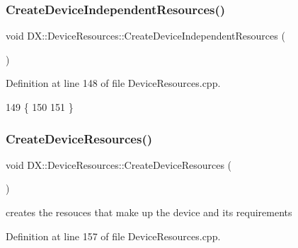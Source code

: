 \subsubsection{\texorpdfstring{Create\+Device\+Independent\+Resources()}{CreateDeviceIndependentResources()}}
{\footnotesize\ttfamily void D\+X\+::\+Device\+Resources\+::\+Create\+Device\+Independent\+Resources (\begin{DoxyParamCaption}{ }\end{DoxyParamCaption})\hspace{0.3cm}{\ttfamily [private]}}



Definition at line 148 of file Device\+Resources.\+cpp.


\begin{DoxyCode}
149 \{
150 
151 \}
\end{DoxyCode}
\mbox{\label{class_d_x_1_1_device_resources_abfbb8815f68e3b3f7d065c3679fbe58f}} 
\subsubsection{\texorpdfstring{Create\+Device\+Resources()}{CreateDeviceResources()}}
{\footnotesize\ttfamily void D\+X\+::\+Device\+Resources\+::\+Create\+Device\+Resources (\begin{DoxyParamCaption}{ }\end{DoxyParamCaption})\hspace{0.3cm}{\ttfamily [private]}}



creates the resouces that make up the device and its requirements 



Definition at line 157 of file Device\+Resources.\+cpp.


